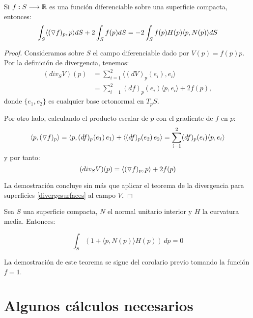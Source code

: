 \begin{corolario}\label{corolariogradiente}
Si $f: S \longrightarrow \mathbb{R}$ es una función diferenciable sobre una superficie compacta, entonces:
%
\begin{equation*}
    \int_S \langle (\triangledown f)_p, p \rangle dS + 2 \int_S f(p)dS = -2 \int_S f(p)H(p) \langle p, N(p) \rangle dS
\end{equation*}
\end{corolario}
\begin{proof}
Consideramos sobre $S$ el campo diferenciable dado por $V(p)=f(p)p$. Por la definición de divergencia, tenemos:
%
\begin{align*}
    (div_S V)(p) &= \sum_{i=1}^2 \langle (dV)_p(e_i), e_i \rangle \\
    &= \sum_{i=1}^2 (df)_p(e_i) \langle p, e_i \rangle + 2f(p),
\end{align*}
%
donde $\{e_1,e_2\}$ es cualquier base ortonormal en $T_pS$.

Por otro lado, calculando el producto escalar de $p$ con el gradiente de $f$ en $p$:
%
\begin{equation*}
    \langle p, (\triangledown f)_p \rangle = \langle p, (df)_p(e_1) \, e_1 \rangle + \langle (df)_p(e_2) \, e_2 \rangle = \sum_{i=1}^2 (df)_p(e_i) \langle p, e_i \rangle 
\end{equation*}
%
y por tanto:
%
\begin{equation*}
    (div_S V)(p) = \langle (\triangledown f)_p, p \rangle + 2f(p)
\end{equation*}

La demostración concluye sin más que aplicar el teorema de la divergencia para superficies \ref{divergesurfaces} al campo $V$.
\end{proof}

\begin{theorem}\label{formulaminkowski}
Sea $S$ una superficie compacta, $N$ el normal unitario interior y $H$ la curvatura media. Entonces:

\begin{equation*}
    \int_S (1+ \langle p, N(p) \rangle H(p)) \, dp = 0
\end{equation*}
\end{theorem}

La demostración de este teorema se sigue del corolario previo tomando la función $f=1$.

\section{Algunos cálculos necesarios}

